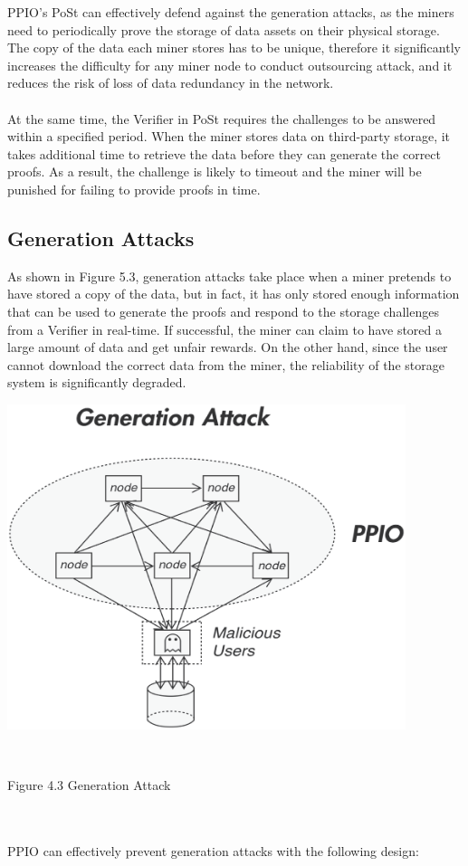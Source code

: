 \documentclass[10pt,a4paper]{article}
\begin{document}
\noindent   
PPIO’s PoSt can effectively defend against the generation attacks, as the miners need to periodically prove the storage of data assets on their physical storage. The copy of the data each miner stores has to be unique, therefore it significantly increases the difficulty for any miner node to conduct outsourcing attack, and it reduces the risk of loss of data redundancy in the network.
   \vspace{-0.5em}
\\\\At the same time, the Verifier in PoSt requires the challenges to be answered within a specified period. When the miner stores data on third-party storage, it takes additional time to retrieve the data before they can generate the correct proofs. As a result, the challenge is likely to timeout and the miner will be punished for failing to provide proofs in time.
   \vspace{-0.5em}
      \subsection{Generation Attacks}  %
As shown in Figure 5.3, generation attacks take place when a miner pretends to have stored a copy of the data, but in fact, it has only stored enough information that can be used to generate the proofs and respond to the storage challenges from a Verifier in real-time. If successful, the miner can claim to have stored a large amount of data and get unfair rewards. On the other hand, since the user cannot download the correct data from the miner, the reliability of the storage system is significantly degraded.
   \vspace{-2.5em}
\\ \centerline{\includegraphics[width=330pt]{fig17}}
\\ \centerline{{Figure 4.3 Generation Attack}}
   \vspace{-1.5em}
\\\\
PPIO can effectively prevent generation attacks with the following design:
   \vspace{-0.8em}
\\
\end{document}
